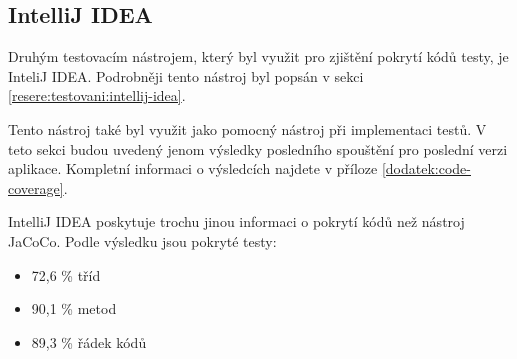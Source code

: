     \subsection{IntelliJ IDEA}
    Druhým testovacím nástrojem, který byl využit pro zjištění pokrytí kódů testy, je InteliJ IDEA. Podrobněji tento nástroj byl popsán v sekci \ref{resere:testovani:intellij-idea}. 
    
    Tento nástroj také byl využit jako pomocný nástroj při implementaci testů. V teto sekci budou uvedený jenom výsledky posledního spouštění pro poslední verzi aplikace. Kompletní informaci o výsledcích najdete v příloze \ref{dodatek:code-coverage}.
    
    IntelliJ IDEA poskytuje trochu jinou informaci o pokrytí kódů než nástroj JaCoCo. Podle výsledku jsou pokryté testy:
    \begin{itemize}
            \item 72,6 \% tříd
            \item 90,1 \% metod
            \item 89,3 \% řádek kódů
    \end{itemize}